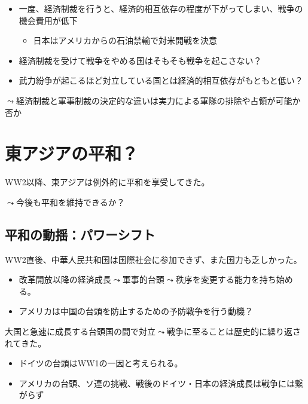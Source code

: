 \documentclass[
  xelatex,
  ja=standard]{bxjsarticle}
\providecommand{\tightlist}{%
  \setlength{\itemsep}{0pt}\setlength{\parskip}{0pt}}\usepackage{longtable,booktabs,array}
\begin{document}
\begin{itemize}
\tightlist
\item
  一度、経済制裁を行うと、経済的相互依存の程度が下がってしまい、戦争の機会費用が低下

  \begin{itemize}
  \tightlist
  \item
    日本はアメリカからの石油禁輸で対米開戦を決意
  \end{itemize}
\item
  経済制裁を受けて戦争をやめる国はそもそも戦争を起こさない？
\item
  武力紛争が起こるほど対立している国とは経済的相互依存がもともと低い？
\end{itemize}

\(\leadsto\)経済制裁と軍事制裁の決定的な違いは実力による軍隊の排除や占領が可能か否か

\hypertarget{ux6771ux30a2ux30b8ux30a2ux306eux5e73ux548c}{%
\section{東アジアの平和？}\label{ux6771ux30a2ux30b8ux30a2ux306eux5e73ux548c}}

WW2以降、東アジアは例外的に平和を享受してきた。

\(\leadsto\)今後も平和を維持できるか？

\hypertarget{ux5e73ux548cux306eux52d5ux63faux30d1ux30efux30fcux30b7ux30d5ux30c8}{%
\subsection{平和の動揺：パワーシフト}\label{ux5e73ux548cux306eux52d5ux63faux30d1ux30efux30fcux30b7ux30d5ux30c8}}

WW2直後、中華人民共和国は国際社会に参加できず、また国力も乏しかった。

\begin{itemize}
\tightlist
\item
  改革開放以降の経済成長\(\leadsto\)軍事的台頭\(\leadsto\)秩序を変更する能力を持ち始める。
\item
  アメリカは中国の台頭を防止するための予防戦争を行う動機？
\end{itemize}

大国と急速に成長する台頭国の間で対立\(\leadsto\)戦争に至ることは歴史的に繰り返されてきた。

\begin{itemize}
\tightlist
\item
  ドイツの台頭はWW1の一因と考えられる。
\item
  アメリカの台頭、ソ連の挑戦、戦後のドイツ・日本の経済成長は戦争には繋がらず
\end{itemize}
\end{document}
